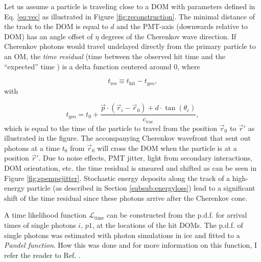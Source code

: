 Let us assume a particle is traveling close to a DOM with parameters defined in Eq. \ref{eq:vec} as illustrated in Figure \ref{fig:reconstruction}. The minimal distance of the track to the DOM is equal to $d$ and the PMT-axis (downwards relative to DOM) has an angle offset of $\eta$ degrees of the Cherenkov wave direction. If Cherenkov photons would travel undelayed directly from the primary particle to an OM, the \textit{time residual} (time between the observed hit time and the ``expected'' time ) is a delta function centered around 0, where

\begin{equation}
t_{\textrm{res}} \equiv t_{\textrm{hit}} - t_{\textrm{geo}},
\end{equation}
\noindent with

\begin{equation}
t_\textrm{geo} = t_0 + \frac{\vec{p} \cdot (\vec{r}_i - \vec{r}_0) + d\cdot \tan (\theta_c)}{c_\textrm{vac}},
\end{equation}
\noindent which is equal to the time of the particle to travel from the position $\vec{r}_0$ to $\vec{r}'$ as illustrated in the figure. The accompanying Cherenkov wavefront that sent out photons at a time $t_0$ from $\vec{r}_0$ will cross the DOM when the particle is at a position $\vec{r}'$. Due to noise effects, PMT jitter, light from secondary interactions, DOM orientation, etc. the time residual is smeared and shifted as can be seen in Figure \ref{fig:spempejitter}. Stochastic energy deposits along the track of a high-energy particle (as described in Section \ref{subsub:energyloss}) lead to a significant shift of the time residual since these photons arrive after the Cherenkov cone.

A time likelihood function $\mathcal{L}_\textrm{time}$ can be constructed from the p.d.f. for arrival times of single photons $i$, $p1$, at the locations of the hit DOMs. The p.d.f. of single photons was estimated with photon simulations in ice and fitted to a \textit{Pandel function}. How this was done and for more information on this function, I refer the reader to Ref. \cite{Ahrens:2003fg}. 

